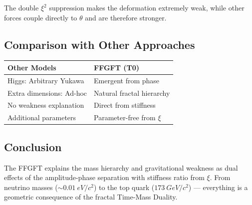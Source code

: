 	The double \(\xi^2\) suppression makes the deformation extremely weak, while other forces couple directly to \(\theta\) and are therefore stronger.
	
	\subsection*{Comparison with Other Approaches}
	
	\begin{center}
		\begin{tabular}{p{}p{}}
			\textbf{Other Models} & \textbf{FFGFT (T0)} \\
			\hline
			Higgs: Arbitrary Yukawa & Emergent from phase \\
			Extra dimensions: Ad-hoc & Natural fractal hierarchy \\
			No weakness explanation & Direct from stiffness \\
			Additional parameters & Parameter-free from \(\xi\) \\
		\end{tabular}
	\end{center}
	
	\subsection*{Conclusion}
	
	The FFGFT explains the mass hierarchy and gravitational weakness as dual effects of the amplitude-phase separation with stiffness ratio from \(\xi\). From neutrino masses (\(\sim \SI{0.01}{eV/c^{2}}\)) to the top quark (\(\SI{173}{GeV/c^{2}}\)) — everything is a geometric consequence of the fractal Time-Mass Duality.



